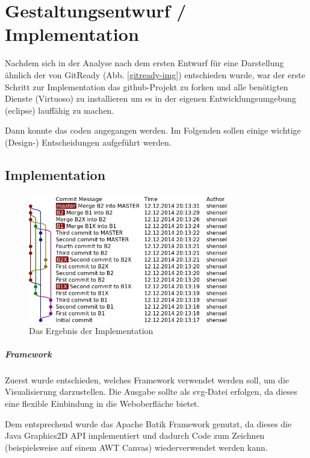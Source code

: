 \documentclass[color, ddc]{tudscrreprt}
\begin{document}
\chapter{Gestaltungsentwurf / Implementation}

Nachdem sich in der Analyse nach dem ersten Entwurf für eine Darstellung ähnlich der von GitReady (Abb. \ref{gitready-img}) entschieden wurde, war der erste Schritt zur Implementation das github-Projekt zu forken und alle benötigten Dienste (Virtuoso) zu installieren um es in der eigenen Entwicklungsumgebung (eclipse) lauffähig zu machen.

Dann konnte das coden angegangen werden. Im Folgenden sollen einige wichtige (Design-) Entscheidungen aufgeführt werden.

\section{Implementation}

\begin{figure}[ht!]
\centering
\includegraphics[width=0.8\textwidth]{Skizzen/revisiongraph.png}
\caption{Das Ergebnis der Implementation}
\label{implementation-img}
\end{figure}

\paragraph{Framework}
Zuerst wurde entschieden, welches Framework verwendet werden soll, um die Visualisierung darzustellen. Die Ausgabe sollte als svg-Datei erfolgen, da dieses eine flexible Einbindung in die Weboberfläche bietet.

Dem entsprechend wurde das Apache Batik Framework genutzt, da dieses die Java Graphics2D API implementiert und dadurch Code zum Zeichnen (beispielsweise auf einem AWT Canvas) wiederverwendet werden kann.
\end{document}
